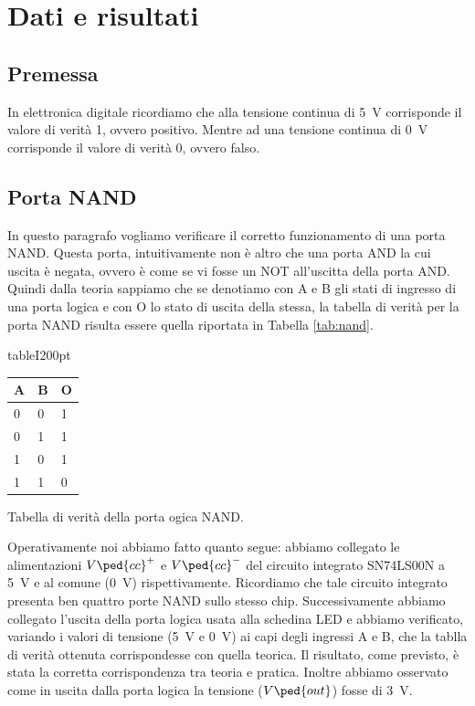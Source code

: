 \section*{Dati e risultati}

\subsection*{Premessa}

In elettronica digitale ricordiamo che alla tensione continua di \SI{+5}{\volt} corrisponde il valore di verità 1, ovvero positivo. Mentre ad una tensione continua di \SI{0}{\volt} corrisponde il valore di verità 0, ovvero falso.

\subsection*{Porta NAND}

In questo paragrafo vogliamo verificare il corretto funzionamento di una porta NAND. Questa porta, intuitivamente non è altro che una porta AND la cui uscita è negata, ovvero è come se vi fosse un NOT all'uscitta della porta AND.
Quindi dalla teoria sappiamo che se denotiamo con A e B gli stati di ingresso di una porta logica e con O lo stato di uscita della stessa, la tabella di verità per la porta NAND risulta essere quella riportata in Tabella \ref{tab:nand}.

\begin{wrapfloat}{table}{I}{200pt}
\centering
	\begin{tabular}{lll}
	\toprule
		A & B & O \\
	\midrule
		0 & 0 & 1 \\
		0 & 1 & 1 \\
		1 & 0 & 1 \\
		1 & 1 & 0 \\
	\bottomrule
	\end{tabular}
	\caption{Tabella di verità della porta ogica NAND.}
	\label{tab:nand}
\end{wrapfloat}

Operativamente noi abbiamo fatto quanto segue: abbiamo collegato le alimentazioni $V\ped{cc}^+$ e $V\ped{cc}^-$ del circuito integrato SN74LS00N a \SI{+5}{\volt} e al comune (\SI{0}{\volt}) rispettivamente. Ricordiamo che tale circuito integrato presenta ben quattro porte NAND sullo stesso chip. Successivamente abbiamo collegato l'uscita della porta logica usata alla schedina LED e abbiamo verificato, variando i valori di tensione (\SI{+5}{\volt} e \SI{0}{\volt}) ai capi degli ingressi A e B, che la tablla di verità ottenuta corrispondesse con quella teorica.
Il risultato, come previsto, è stata la corretta corrispondenza tra teoria e pratica. Inoltre abbiamo osservato come in uscita dalla porta logica la tensione ($V\ped{out}$) fosse di \SI{+3}{\volt}.

